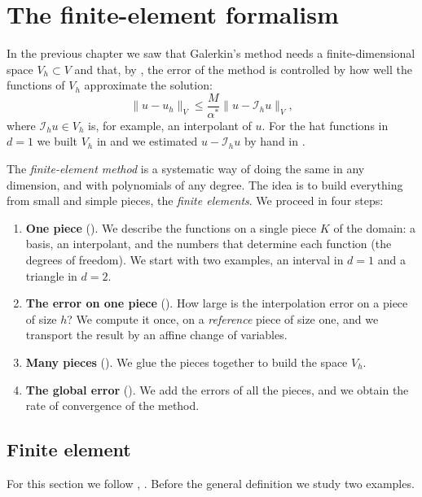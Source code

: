 \chapter{The finite-element formalism}

In the previous chapter we saw that Galerkin's method needs a finite-dimensional space $V_h \subset V$ and that, by , the error of the method is controlled by how well the functions of $V_h$ approximate the solution:
\begin{equation*}
    \|u - u_h\|_V \le \frac{M}{\alpha^*} \|u - \mathcal I_h u\|_V,
\end{equation*}
where $\mathcal I_h u \in V_h$ is, for example, an interpolant of $u$.
For the hat functions in $d = 1$ we built $V_h$ in  and we estimated $u - \mathcal I_h u$ by hand in .

The \emph{finite-element method} is a systematic way of doing the same in any dimension, and with polynomials of any degree.
The idea is to build everything from small and simple pieces, the \emph{finite elements}.
We proceed in four steps:
\begin{enumerate}
    \item \textbf{One piece} ().
          We describe the functions on a single piece $K$ of the domain: a basis, an interpolant, and the numbers that determine each function (the degrees of freedom).
          We start with two examples, an interval in $d = 1$ and a triangle in $d = 2$.
    \item \textbf{The error on one piece} ().
          How large is the interpolation error on a piece of size $h$?
          We compute it once, on a \emph{reference} piece of size one, and we transport the result by an affine change of variables.
    \item \textbf{Many pieces} ().
          We glue the pieces together to build the space $V_h$.
    \item \textbf{The global error} ().
          We add the errors of all the pieces, and we obtain the rate of convergence of the method.
\end{enumerate}

\section{Finite element}
\label{sec:FEM finite element}
For this section we follow \cite[Section 2.3]{ciarletFiniteElementMethod2002}, \cite[Chapter 3]{Suli}.
Before the general definition we study two examples.

